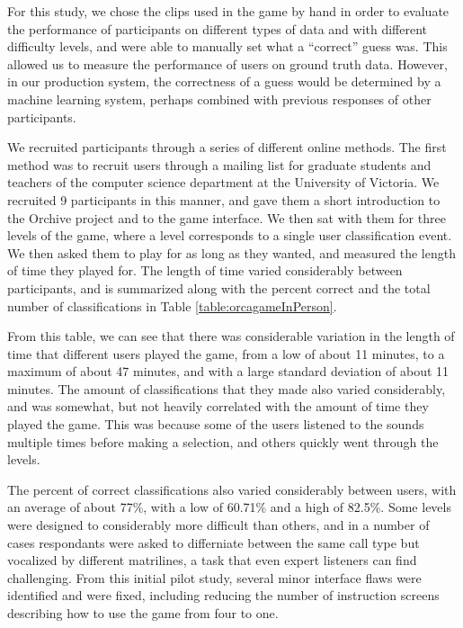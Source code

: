 \documentclass[12pt,oneside]{book}
\begin{document}
For this study, we chose the clips used in the game by hand in order
to evaluate the performance of participants on different types of data
and with different difficulty levels, and were able to manually set
what a ``correct'' guess was.  This allowed us to measure the
performance of users on ground truth data.  However, in our production
system, the correctness of a guess would be determined by a machine
learning system, perhaps combined with previous responses of other
participants.

We recruited participants through a series of different online
methods.  The first method was to recruit users through a mailing list
for graduate students and teachers of the computer science department
at the University of Victoria.  We recruited 9 participants in this
manner, and gave them a short introduction to the Orchive project and
to the game interface.  We then sat with them for three levels of the
game, where a level corresponds to a single user classification event.
We then asked them to play for as long as they wanted, and measured
the length of time they played for.  The length of time varied
considerably between participants, and is summarized along with the
percent correct and the total number of classifications in Table
\ref{table:orcagameInPerson}.

From this table, we can see that there was considerable variation in
the length of time that different users played the game, from a low of
about 11 minutes, to a maximum of about 47 minutes, and with a large
standard deviation of about 11 minutes.  The amount of classifications
that they made also varied considerably, and was somewhat, but not
heavily correlated with the amount of time they played the game.  This
was because some of the users listened to the sounds multiple times
before making a selection, and others quickly went through the
levels.

The percent of correct classifications also varied considerably
between users, with an average of about 77\%, with a low of 60.71\%
and a high of 82.5\%.  Some levels were designed to considerably more
difficult than others, and in a number of cases respondants were asked
to differniate between the same call type but vocalized by different
matrilines, a task that even expert listeners can find challenging.
From this initial pilot study, several minor interface flaws were
identified and were fixed, including reducing the number of
instruction screens describing how to use the game from four to one.
\end{document}
